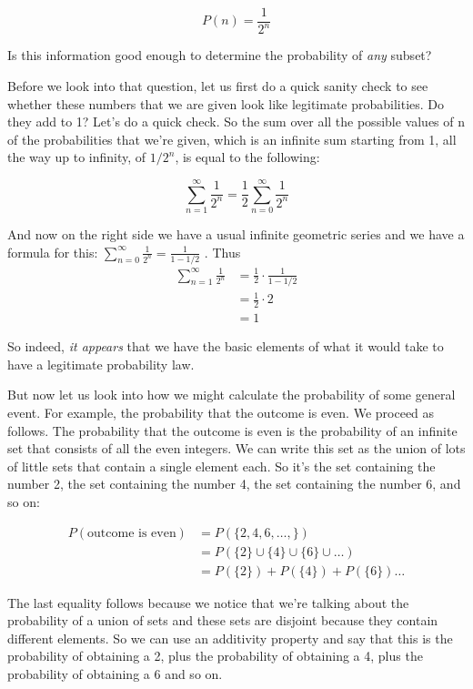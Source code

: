 \documentclass{tufte-handout}
\begin{document}
$$
P(n) = \frac{1}{2^n}
$$


Is this information good
enough to determine the probability of \textit{any} subset?

Before we look into that question, let us first do a quick sanity check to see whether these numbers that
we are given look like legitimate probabilities. Do they add to 1? Let's do a quick check. So the sum
over all the possible values of n of the probabilities that we're given, which is an infinite sum starting
from 1, all the way up to infinity, of $1/2^n$, is equal to the following:

$$
\sum_{n=1}^{\infty} \frac{1}{2^n} = \frac{1}{2} \sum_{n=0}^{\infty} \frac{1}{2^n} 
$$

And now on the right side we have a usual infinite geometric series and we have a formula for this:
$\sum_{n=0}^{\infty} \frac{1}{2^n}  = \frac{1}{1 - 1/2}$ . Thus
\begin{align*}
\sum_{n=1}^{\infty} \frac{1}{2^n} &= \frac{1}{2} \cdot \frac{1}{1 - 1/2}\\
&= \frac{1}{2} \cdot 2\\
&= 1
\end{align*}

So indeed, \textit{it appears }that we have the basic elements of what
it would take to have a legitimate probability law.


\vspace{0.4cm}
But now let us look into how we might calculate the probability of some general event. For example, the
probability that the outcome is even. We proceed as follows. The probability that the outcome is even 
is the probability of an infinite set that consists of all the even integers. We can write this set as the
union of lots of little sets that contain a single element each. So it's the set containing the number 2, the
set containing the number 4, the set containing the number 6, and so on:


\begin{align*}
P( \text{outcome is even}) &= P(\{ 2, 4, 6, \ldots, \})\\
&= P(\{ 2\} \cup \{ 4\} \cup \{ 6\} \cup \ldots) \\
&= P(\{ 2\}) + P(\{ 4\}) + P(\{ 6\}) \ldots
\end{align*}

The last equality follows because we notice that we're talking about the probability of a union of sets and these sets are
disjoint because they contain different elements. So we can use an additivity property and say that this
is the probability of obtaining a 2, plus the probability of obtaining a 4, plus the probability of obtaining a
6 and so on.
\end{document}
